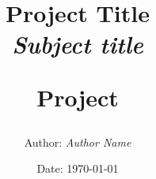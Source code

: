 \newcommand{\authorName}{Author Name}
\newcommand{\titleName}{Project Title}
\newcommand{\subject}{Subject title}
\newcommand{\project}{Project}
\begin{titlepage}
  \centering
    \title
    {
      \Huge \textbf{\titleName}\\
      \scale{\numberSQRTTWO}{\vspace{\sol pt}}
      \LARGE \textit{\subject}
      \scale{\numberSQRTTWO}{\rule{\linewidth}{\sol pt}}

      \textbf{\project}
      \author
    {
      \LARGE Author: \textit{\authorName}
    }
      \date{\LARGE Date: \today}
    }
\end{titlepage}
